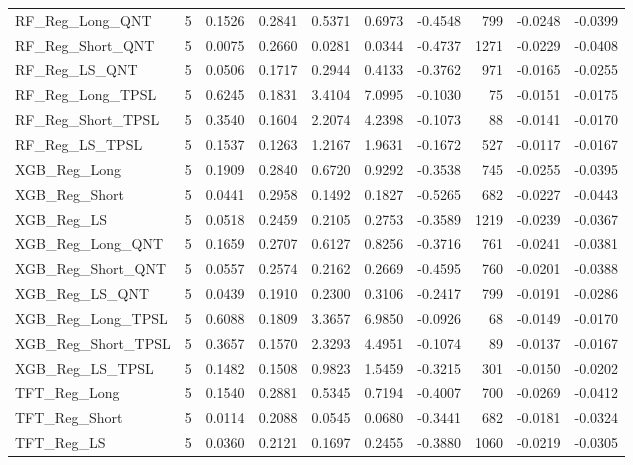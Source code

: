 \begin{tabular}{llrrrrrrrr}
\cline{1-10}
RF\_Reg\_Long\_QNT & 5 & 0.1526 & 0.2841 & 0.5371 & 0.6973 & -0.4548 & 799 & -0.0248 & -0.0399 \\
\cline{1-10}
RF\_Reg\_Short\_QNT & 5 & 0.0075 & 0.2660 & 0.0281 & 0.0344 & -0.4737 & 1271 & -0.0229 & -0.0408 \\
\cline{1-10}
RF\_Reg\_LS\_QNT & 5 & 0.0506 & 0.1717 & 0.2944 & 0.4133 & -0.3762 & 971 & -0.0165 & -0.0255 \\
\cline{1-10}
RF\_Reg\_Long\_TPSL & 5 & 0.6245 & 0.1831 & 3.4104 & 7.0995 & -0.1030 & 75 & -0.0151 & -0.0175 \\
\cline{1-10}
RF\_Reg\_Short\_TPSL & 5 & 0.3540 & 0.1604 & 2.2074 & 4.2398 & -0.1073 & 88 & -0.0141 & -0.0170 \\
\cline{1-10}
RF\_Reg\_LS\_TPSL & 5 & 0.1537 & 0.1263 & 1.2167 & 1.9631 & -0.1672 & 527 & -0.0117 & -0.0167 \\
\cline{1-10}
XGB\_Reg\_Long & 5 & 0.1909 & 0.2840 & 0.6720 & 0.9292 & -0.3538 & 745 & -0.0255 & -0.0395 \\
\cline{1-10}
XGB\_Reg\_Short & 5 & 0.0441 & 0.2958 & 0.1492 & 0.1827 & -0.5265 & 682 & -0.0227 & -0.0443 \\
\cline{1-10}
XGB\_Reg\_LS & 5 & 0.0518 & 0.2459 & 0.2105 & 0.2753 & -0.3589 & 1219 & -0.0239 & -0.0367 \\
\cline{1-10}
XGB\_Reg\_Long\_QNT & 5 & 0.1659 & 0.2707 & 0.6127 & 0.8256 & -0.3716 & 761 & -0.0241 & -0.0381 \\
\cline{1-10}
XGB\_Reg\_Short\_QNT & 5 & 0.0557 & 0.2574 & 0.2162 & 0.2669 & -0.4595 & 760 & -0.0201 & -0.0388 \\
\cline{1-10}
XGB\_Reg\_LS\_QNT & 5 & 0.0439 & 0.1910 & 0.2300 & 0.3106 & -0.2417 & 799 & -0.0191 & -0.0286 \\
\cline{1-10}
XGB\_Reg\_Long\_TPSL & 5 & 0.6088 & 0.1809 & 3.3657 & 6.9850 & -0.0926 & 68 & -0.0149 & -0.0170 \\
\cline{1-10}
XGB\_Reg\_Short\_TPSL & 5 & 0.3657 & 0.1570 & 2.3293 & 4.4951 & -0.1074 & 89 & -0.0137 & -0.0167 \\
\cline{1-10}
XGB\_Reg\_LS\_TPSL & 5 & 0.1482 & 0.1508 & 0.9823 & 1.5459 & -0.3215 & 301 & -0.0150 & -0.0202 \\
\cline{1-10}
TFT\_Reg\_Long & 5 & 0.1540 & 0.2881 & 0.5345 & 0.7194 & -0.4007 & 700 & -0.0269 & -0.0412 \\
\cline{1-10}
TFT\_Reg\_Short & 5 & 0.0114 & 0.2088 & 0.0545 & 0.0680 & -0.3441 & 682 & -0.0181 & -0.0324 \\
\cline{1-10}
TFT\_Reg\_LS & 5 & 0.0360 & 0.2121 & 0.1697 & 0.2455 & -0.3880 & 1060 & -0.0219 & -0.0305 \\

\end{tabular}

